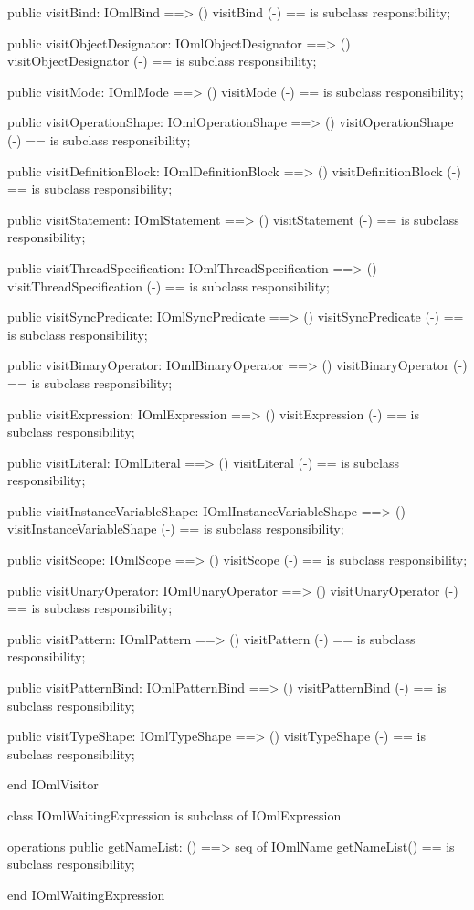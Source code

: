 \begin{vdm_al}
  public visitBind: IOmlBind ==> ()
  visitBind (-) == is subclass responsibility;

  public visitObjectDesignator: IOmlObjectDesignator ==> ()
  visitObjectDesignator (-) == is subclass responsibility;

  public visitMode: IOmlMode ==> ()
  visitMode (-) == is subclass responsibility;

  public visitOperationShape: IOmlOperationShape ==> ()
  visitOperationShape (-) == is subclass responsibility;

  public visitDefinitionBlock: IOmlDefinitionBlock ==> ()
  visitDefinitionBlock (-) == is subclass responsibility;

  public visitStatement: IOmlStatement ==> ()
  visitStatement (-) == is subclass responsibility;

  public visitThreadSpecification: IOmlThreadSpecification ==> ()
  visitThreadSpecification (-) == is subclass responsibility;

  public visitSyncPredicate: IOmlSyncPredicate ==> ()
  visitSyncPredicate (-) == is subclass responsibility;

  public visitBinaryOperator: IOmlBinaryOperator ==> ()
  visitBinaryOperator (-) == is subclass responsibility;

  public visitExpression: IOmlExpression ==> ()
  visitExpression (-) == is subclass responsibility;

  public visitLiteral: IOmlLiteral ==> ()
  visitLiteral (-) == is subclass responsibility;

  public visitInstanceVariableShape: IOmlInstanceVariableShape ==> ()
  visitInstanceVariableShape (-) == is subclass responsibility;

  public visitScope: IOmlScope ==> ()
  visitScope (-) == is subclass responsibility;

  public visitUnaryOperator: IOmlUnaryOperator ==> ()
  visitUnaryOperator (-) == is subclass responsibility;

  public visitPattern: IOmlPattern ==> ()
  visitPattern (-) == is subclass responsibility;

  public visitPatternBind: IOmlPatternBind ==> ()
  visitPatternBind (-) == is subclass responsibility;

  public visitTypeShape: IOmlTypeShape ==> ()
  visitTypeShape (-) == is subclass responsibility;

end IOmlVisitor
\end{vdm_al}

\begin{vdm_al}
class IOmlWaitingExpression
 is subclass of IOmlExpression

operations
  public getNameList: () ==> seq of IOmlName
  getNameList() == is subclass responsibility;

end IOmlWaitingExpression
\end{vdm_al}

